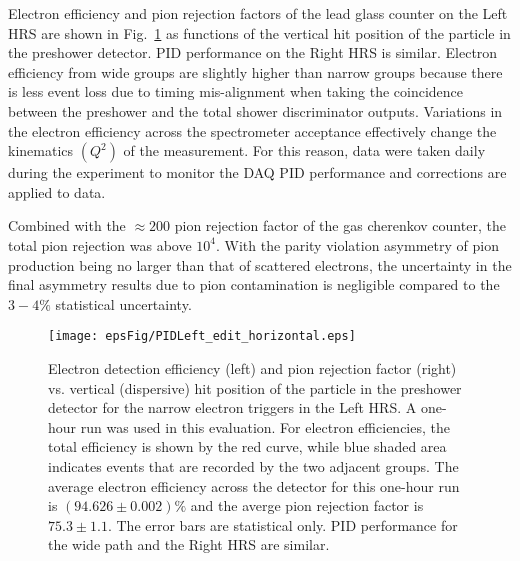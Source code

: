 Electron efficiency
and pion rejection factors of the lead glass counter on the Left HRS are 
shown in Fig.~\ref{fig:pidLeft} as functions of the vertical hit position 
of the particle in the preshower detector. PID performance on the Right HRS
is similar.
%
Electron efficiency from wide groups are slightly higher than narrow groups
because there is less event loss due to timing mis-alignment when taking the
coincidence between the preshower and the total shower discriminator outputs.
%
Variations in the electron efficiency across the spectrometer acceptance 
effectively change the kinematics $(Q^2)$ of the measurement. For this reason, 
data were taken daily during the experiment to monitor the DAQ PID performance
and corrections are applied to data. 

Combined with the $\approx 200$ pion rejection factor of the gas cherenkov
counter, the total pion rejection was above $10^{4}$. With the parity violation
asymmetry of pion production being no larger than that of scattered electrons, 
the uncertainty in the final asymmetry results due to pion contamination is
negligible compared to the $3-4\%$ statistical uncertainty.

\begin{figure}[!ht]
\hspace*{-0.6cm}
\texttt{[image: epsFig/PIDLeft\_edit\_horizontal.eps]}
\caption{Electron detection efficiency (left) and pion rejection factor (right) 
vs. vertical (dispersive) hit position of the particle in the preshower detector 
for the narrow electron triggers in the Left HRS. A one-hour run was used in this 
evaluation.
For electron efficiencies, the total efficiency is shown by the red curve, while blue 
shaded area indicates events that are recorded by the two adjacent groups. 
The average electron efficiency across the detector for this one-hour run
is $(94.626\pm 0.002)\%$ and the averge
pion rejection factor is $75.3\pm 1.1$. The error bars are statistical only.
PID performance for the wide path and the Right HRS are similar.
}
\label{fig:pidLeft}
\end{figure}


